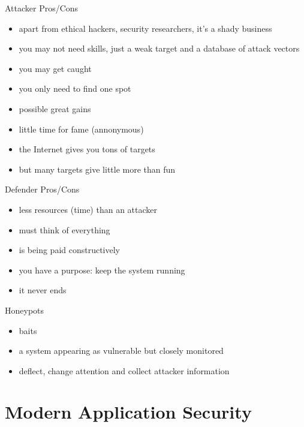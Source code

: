 \documentclass{curs}
\begin{document}
\begin{frame}{Attacker Pros/Cons}
  \begin{itemize}
    \item apart from ethical hackers, security researchers, it's a shady business
    \item you may not need skills, just a weak target and a database of attack vectors
    \item you may get caught
    \item you only need to find one spot
    \item possible great gains
    \item little time for fame (annonymous)
    \item the Internet gives you tons of targets
    \item but many targets give little more than fun
  \end{itemize}
\end{frame}

\begin{frame}{Defender Pros/Cons}
  \begin{itemize}
    \item less resources (time) than an attacker
    \item must think of everything
    \item is being paid constructively
    \item you have a purpose: keep the system running
    \item it never ends
  \end{itemize}
\end{frame}

\begin{frame}{Honeypots}
  \begin{itemize}
    \item baits
    \item a system appearing as vulnerable but closely monitored
    \item deflect, change attention and collect attacker information
  \end{itemize}
\end{frame}

\section{Modern Application Security}
\end{document}
